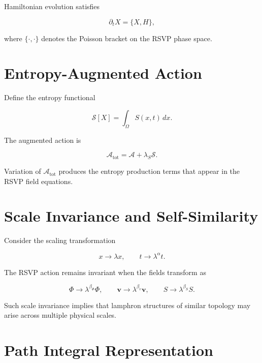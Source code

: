 \documentclass[12pt]{article}
\begin{document}
Hamiltonian evolution satisfies

\begin{equation}
\partial_t X = \{X,H\},
\end{equation}

where $\{\cdot,\cdot\}$ denotes the Poisson bracket on the RSVP phase space.

\section{Entropy-Augmented Action}

Define the entropy functional

\begin{equation}
\mathcal{S}[X] =
\int_{\Omega} S(x,t)\,dx .
\end{equation}

The augmented action is

\begin{equation}
\mathcal{A}_{\mathrm{tot}}
=
\mathcal{A}
+
\lambda_S \mathcal{S}.
\end{equation}

Variation of $\mathcal{A}_{\mathrm{tot}}$ produces the entropy production terms that appear in the RSVP field equations.

\section{Scale Invariance and Self-Similarity}

Consider the scaling transformation

\begin{equation}
x \rightarrow \lambda x,
\qquad
t \rightarrow \lambda^\alpha t .
\end{equation}

The RSVP action remains invariant when the fields transform as

\begin{equation}
\Phi \rightarrow \lambda^{\beta_\Phi}\Phi,
\qquad
\mathbf{v} \rightarrow \lambda^{\beta_v}\mathbf{v},
\qquad
S \rightarrow \lambda^{\beta_S}S .
\end{equation}

Such scale invariance implies that lamphron structures of similar topology may arise across multiple physical scales.

\section{Path Integral Representation}
\end{document}
